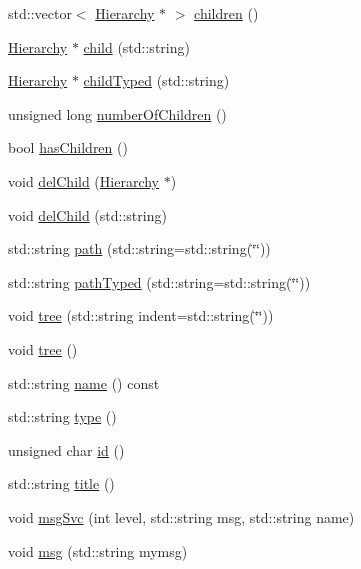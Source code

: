\begin{DoxyCompactItemize}
\item 
std::vector$<$ \hyperlink{classHierarchy}{Hierarchy} $\ast$ $>$ \hyperlink{classHierarchy_aa9a76f69e98e052ee1a6e32cea006288}{children} ()
\item 
\hyperlink{classHierarchy}{Hierarchy} $\ast$ \hyperlink{classHierarchy_a1e207f973c694b538bf90107b4868817}{child} (std::string)
\item 
\hyperlink{classHierarchy}{Hierarchy} $\ast$ \hyperlink{classHierarchy_a0c15a5276a3b80b4354d6bd8a01e0708}{childTyped} (std::string)
\item 
unsigned long \hyperlink{classHierarchy_ab16e84de65fd84e14001a6cf941c8be4}{numberOfChildren} ()
\item 
bool \hyperlink{classHierarchy_a255174fe4d316d2a3f430dcb9dab29f1}{hasChildren} ()
\item 
void \hyperlink{classHierarchy_a2b2b359fac003233f65786a616766bde}{delChild} (\hyperlink{classHierarchy}{Hierarchy} $\ast$)
\item 
void \hyperlink{classHierarchy_a1928ac7615fe0b5e55cd707f70dc6781}{delChild} (std::string)
\item 
std::string \hyperlink{classHierarchy_aa7990fa7caf132d83e361ce033c6c65a}{path} (std::string=std::string(\char`\"{}\char`\"{}))
\item 
std::string \hyperlink{classHierarchy_a1efd56cd164d328d2002e53a10a19b8c}{pathTyped} (std::string=std::string(\char`\"{}\char`\"{}))
\item 
void \hyperlink{classHierarchy_a76e914b9a677a22a82deb74d892bf261}{tree} (std::string indent=std::string(\char`\"{}\char`\"{}))
\item 
void \hyperlink{classHierarchy_a594c294c5f60c230e106d522ed008212}{tree} ()
\item 
std::string \hyperlink{classObject_a975e888d50bfcbffda2c86368332a5cd}{name} () const 
\item 
std::string \hyperlink{classObject_a84f99f70f144a83e1582d1d0f84e4e62}{type} ()
\item 
unsigned char \hyperlink{classObject_af99145335cc61ff6e2798ea17db009d2}{id} ()
\item 
std::string \hyperlink{classObject_a73a0f1a41828fdd8303dd662446fb6c3}{title} ()
\item 
void \hyperlink{classObject_a3f9d5537ebce0c0f2bf6ae4d92426f3c}{msgSvc} (int level, std::string msg, std::string name)
\item 
void \hyperlink{classObject_a58b2d0618c2d08cf2383012611528d97}{msg} (std::string mymsg)
\item 

\end{DoxyCompactItemize}
